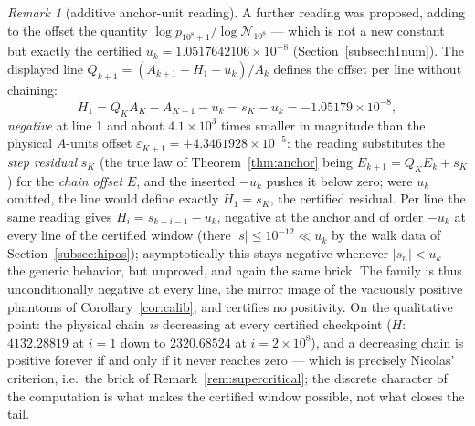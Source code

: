 \documentclass[11pt]{article}
\theoremstyle{remark}
\newtheorem{remark}[theorem]{Remark}
\newcommand{\uk}{u_k}
\newcommand{\eps}{\varepsilon}
\begin{document}
\begin{remark}[additive anchor-unit reading]\label{rem:uadd}
A further reading was proposed, adding to the offset the quantity
$\log p_{10^8+1}/\log\mathcal N_{10^8}$ --- which is not a new constant
but exactly the certified $\uk=1.0517642106\times10^{-8}$
(Section~\ref{subsec:h1num}). The displayed line
$Q_{k+1}=(A_{k+1}+H_1+\uk)/A_k$ defines the offset per line without
chaining:
\[
H_1=Q_KA_K-A_{K+1}-\uk=s_K-\uk=-1.05179\times10^{-8},
\]
\emph{negative} at line 1 and about $4.1\times10^{3}$ times smaller in
magnitude than the physical $A$-units offset
$\eps_{K+1}=+4.3461928\times10^{-5}$: the reading substitutes the
\emph{step residual} $s_K$ (the true law of Theorem~\ref{thm:anchor}
being $E_{k+1}=Q_KE_k+s_K$) for the \emph{chain offset} $E$, and the
inserted $-\uk$ pushes it below zero; were $\uk$ omitted, the line
would define exactly $H_1=s_K$, the certified residual. Per line the
same reading gives $H_i=s_{k+i-1}-\uk$, negative at the anchor and of
order $-\uk$ at every line of the certified window (there
$|s|\le10^{-12}\ll\uk$ by the walk data of
Section~\ref{subsec:hipos}); asymptotically this stays negative
whenever $|s_n|<\uk$ --- the generic behavior, but unproved, and again
the same brick. The family is thus unconditionally negative at every
line, the mirror image of the vacuously positive phantoms of
Corollary~\ref{cor:calib}, and certifies no positivity. On the
qualitative point: the physical chain \emph{is} decreasing at every
certified checkpoint ($H$: $4132.28819$ at $i=1$ down to
$2320.68524$ at $i=2\times10^8$), and a decreasing chain is positive
forever if and only if it never reaches zero --- which is precisely
Nicolas' criterion, i.e.\ the brick of
Remark~\ref{rem:supercritical}; the discrete character of the
computation is what makes the certified window possible, not what
closes the tail.
\end{remark}
\end{document}
